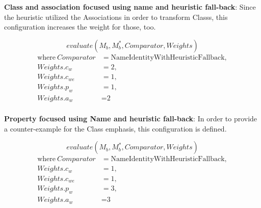 \textbf{Class and association focused using name and heuristic fall-back}: Since the heuristic utilized the \glspl{Association} in order to transform \glspl{Class}, this configuration increases the weight for those, too.

$$evaluate(M_b, M_b^*, Comparator, Weights)$$
\begin{align*}
  \text{where}~Comparator &= \text{NameIdentityWithHeuristicFallback}, \\
  Weights.c_w &= \text{2}, \\
  Weights.c_{we} &= \text{1}, \\
  Weights.p_w &= \text{1}, \\
  Weights.a_w &= \text{2} \\
\end{align*}

\textbf{Property focused using Name and heuristic fall-back}: In order to provide a counter-example for the \gls{Class} emphasis, this configuration is defined.

$$evaluate(M_b, M_b^*, Comparator, Weights)$$
\begin{align*}
  \text{where}~Comparator &= \text{NameIdentityWithHeuristicFallback}, \\
  Weights.c_w &= \text{1}, \\
  Weights.c_{we} &= \text{1}, \\
  Weights.p_w &= \text{3}, \\
  Weights.a_w &= \text{3} \\
\end{align*}

